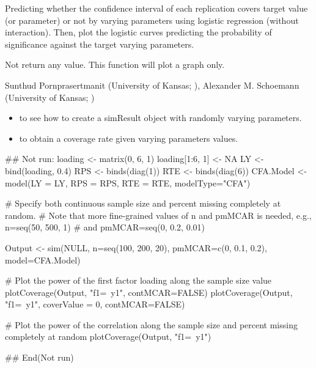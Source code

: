 \documentclass[a4paper]{book}
\begin{document}
%
\begin{Details}\relax
Predicting whether the confidence interval of each replication covers target value (or parameter) or not by varying parameters using logistic regression (without interaction). Then, plot the logistic curves predicting the probability of significance against the target varying parameters.
\end{Details}
%
\begin{Value}
Not return any value. This function will plot a graph only.
\end{Value}
%
\begin{Author}\relax
Sunthud Pornprasertmanit (University of Kansas; ), Alexander M. Schoemann (University of Kansas; )
\end{Author}
%
\begin{SeeAlso}\relax
\begin{itemize}

\item {} to see how to create a simResult object with randomly varying parameters.
\item {} to obtain a coverage rate given varying parameters values.

\end{itemize}

\end{SeeAlso}
%
\begin{Examples}
\begin{ExampleCode}
## Not run: 
loading <- matrix(0, 6, 1)
loading[1:6, 1] <- NA
LY <- bind(loading, 0.4)
RPS <- binds(diag(1))
RTE <- binds(diag(6))
CFA.Model <- model(LY = LY, RPS = RPS, RTE = RTE, modelType="CFA")

# Specify both continuous sample size and percent missing completely at random. 
# Note that more fine-grained values of n and pmMCAR is needed, e.g., n=seq(50, 500, 1) 
# and pmMCAR=seq(0, 0.2, 0.01)

Output <- sim(NULL, n=seq(100, 200, 20), pmMCAR=c(0, 0.1, 0.2), model=CFA.Model)

# Plot the power of the first factor loading along the sample size value
plotCoverage(Output, "f1=~y1", contMCAR=FALSE)
plotCoverage(Output, "f1=~y1", coverValue = 0, contMCAR=FALSE)

# Plot the power of the correlation along the sample size and percent missing completely at random
plotCoverage(Output, "f1=~y1")

## End(Not run)
\end{ExampleCode}
\end{Examples}
\end{document}
